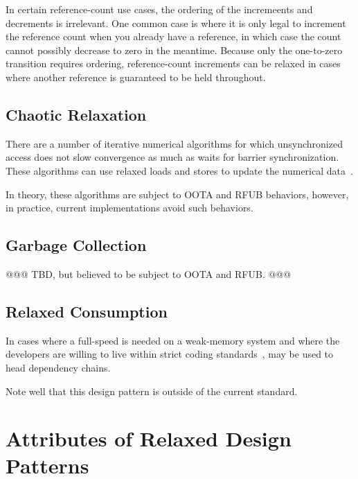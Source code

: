 \documentclass[10]{article}
\begin{document}
In certain reference-count use cases, the ordering of the incremeents and
decrements is irrelevant.
One common case is where it is only legal to increment the reference
count when you already have a reference, in which case the count cannot
possibly decrease to zero in the meantime.
Because only the one-to-zero transition requires ordering, reference-count
increments can be relaxed in cases where another reference is guaranteed
to be held throughout.

\subsection{Chaotic Relaxation}
\label{sec:Chaotic Relaxation}

There are a number of iterative numerical algorithms for which unsynchronized
access does not slow convergence as much as waits for barrier synchronization.
These algorithms can use relaxed loads and stores to update the numerical
data~\cite{Andrews91textbook}.

In theory, these algorithms are subject to OOTA and RFUB behaviors, however,
in practice, current implementations avoid such behaviors.

\subsection{Garbage Collection}
\label{sec:Garbage Collection}

@@@ TBD, but believed to be subject to OOTA and RFUB. @@@

\subsection{Relaxed Consumption}
\label{sec:Relaxed Consumption}

In cases where a full-speed  is needed on a
weak-memory system and where the developers are willing to live within
strict coding standards~\cite{PaulEMcKenney2014rcu-dereference},
 may be used to head dependency chains.

Note well that this design pattern is outside of the current standard.

\section{Attributes of Relaxed Design Patterns}
\label{sec:Attributes of Relaxed Design Patterns}
\end{document}
